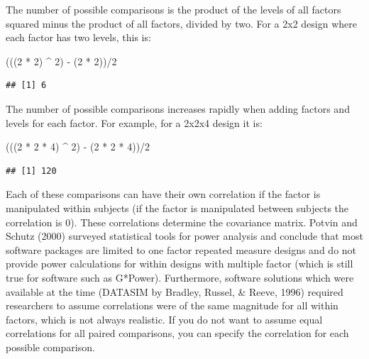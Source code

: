 \documentclass[
]{book}
\newenvironment{Shaded}{\begin{snugshade}}{\end{snugshade}}
\newcommand{\DecValTok}[1]{\textcolor[rgb]{0.00,0.00,0.81}{#1}}
\newcommand{\NormalTok}[1]{#1}
\newcommand{\SpecialCharTok}[1]{\textcolor[rgb]{0.00,0.00,0.00}{#1}}
\begin{document}
The number of possible comparisons is the product of the levels of all factors squared minus the product of all factors, divided by two. For a 2x2 design where each factor has two levels, this is:

\begin{Shaded}
\begin{Highlighting}[]
\NormalTok{(((}\DecValTok{2} \SpecialCharTok{*} \DecValTok{2}\NormalTok{) }\SpecialCharTok{\^{}} \DecValTok{2}\NormalTok{) }\SpecialCharTok{{-}}\NormalTok{ (}\DecValTok{2} \SpecialCharTok{*} \DecValTok{2}\NormalTok{))}\SpecialCharTok{/}\DecValTok{2}
\end{Highlighting}
\end{Shaded}

\begin{verbatim}
## [1] 6
\end{verbatim}

The number of possible comparisons increases rapidly when adding factors and levels for each factor. For example, for a 2x2x4 design it is:

\begin{Shaded}
\begin{Highlighting}[]
\NormalTok{(((}\DecValTok{2} \SpecialCharTok{*} \DecValTok{2} \SpecialCharTok{*} \DecValTok{4}\NormalTok{) }\SpecialCharTok{\^{}} \DecValTok{2}\NormalTok{) }\SpecialCharTok{{-}}\NormalTok{ (}\DecValTok{2} \SpecialCharTok{*} \DecValTok{2} \SpecialCharTok{*} \DecValTok{4}\NormalTok{))}\SpecialCharTok{/}\DecValTok{2}
\end{Highlighting}
\end{Shaded}

\begin{verbatim}
## [1] 120
\end{verbatim}

Each of these comparisons can have their own correlation if the factor is manipulated within subjects (if the factor is manipulated between subjects the correlation is 0).
These correlations determine the covariance matrix.
Potvin and Schutz (2000) surveyed statistical tools for power analysis and conclude that most software packages are limited to one factor repeated measure designs and do not provide power calculations for within designs with multiple factor (which is still true for software such as G*Power).
Furthermore, software solutions which were available at the time (DATASIM by Bradley, Russel, \& Reeve, 1996) required researchers to assume correlations were of the same magnitude for all within factors, which is not always realistic.
If you do not want to assume equal correlations for all paired comparisons, you can specify the correlation for each possible comparison.
\end{document}
